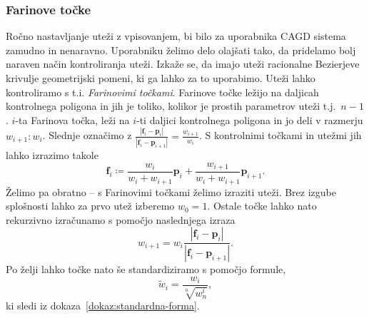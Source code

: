 \documentclass[isrm2, tisk]{fmfdelo}
\newcommand{\p}{\textbf{p}}
\begin{document}
    \subsubsection{Farinove točke}
    Ročno nastavljanje uteži z vpisovanjem, bi bilo za uporabnika CAGD sistema zamudno in nenaravno.
    Uporabniku želimo delo olajšati tako, da pridelamo bolj naraven način kontroliranja uteži.
    Izkaže se, da imajo uteži racionalne Bezierjeve krivulje geometrijski pomeni, ki ga lahko za to uporabimo.
    Uteži lahko kontroliramo s t.i. \textit{Farinovimi točkami}.
    Farinove točke ležijo na daljicah kontrolnega poligona in jih je toliko, kolikor je prostih parametrov uteži t.j.\ $n-1$.
    $i$-ta Farinova točka, leži na $i$-ti daljici kontrolnega poligona in jo deli v razmerju $w_{i+1}:w_{i}$.
    Slednje označimo z $\frac{|\mathbf{f}_i-\p_i|}{|\mathbf{f}_i-\p_{i+1}|} = \frac{w_{i+1}}{w_{i}}$.
    S kontrolnimi točkami in utežmi jih lahko izrazimo takole
    \[\mathbf{f}_i \coloneqq \frac{w_{i}}{w_{i}+w_{i+1}}\p_i +  \frac{w_{i+1}}{w_{i}+w_{i+1}}\p_{i+1}.\]
    Želimo pa obratno – s Farinovimi točkami želimo izraziti uteži.
    Brez izgube splošnosti lahko za prvo utež izberemo $w_0=1$.
    Ostale točke lahko nato rekurzivno izračunamo s pomočjo naslednjega izraza
    \[w_{i+1} = w_i\frac{|\mathbf{f}_i-\p_i|}{|\mathbf{f}_i-\p_{i+1}|}.\]
    Po želji lahko točke nato še standardiziramo s pomočjo formule,\[\tilde{w}_{i} = \frac{w_i}{\sqrt[n]{w_n^i}},\]
    ki sledi iz dokaza~\ref{dokaz:standardna-forma}.
\end{document}

